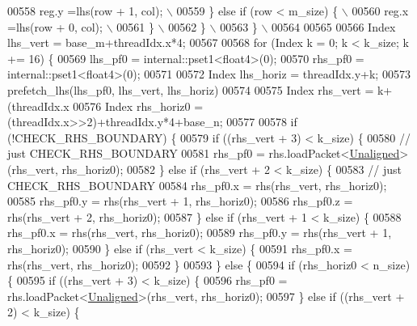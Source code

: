 \begin{DoxyCode}
00558 \textcolor{preprocessor}{          reg.y =lhs(row + 1, col);                   \(\backslash\)}
00559 \textcolor{preprocessor}{        \} else if (row  < m\_size) \{                   \(\backslash\)}
00560 \textcolor{preprocessor}{          reg.x =lhs(row + 0, col);                   \(\backslash\)}
00561 \textcolor{preprocessor}{        \}                                             \(\backslash\)}
00562 \textcolor{preprocessor}{      \}                                               \(\backslash\)}
00563 \textcolor{preprocessor}{    \}                                                 \(\backslash\)}
00564 \textcolor{preprocessor}{}
00565 
00566   Index lhs\_vert = base\_m+threadIdx.x*4;
00567 
00568   \textcolor{keywordflow}{for} (Index k = 0; k < k\_size; k += 16) \{
00569     lhs\_pf0 = internal::pset1<float4>(0);
00570     rhs\_pf0 = internal::pset1<float4>(0);
00571 
00572     Index lhs\_horiz = threadIdx.y+k;
00573     prefetch\_lhs(lhs\_pf0, lhs\_vert, lhs\_horiz)
00574 
00575     Index rhs\_vert = k+(threadIdx.x%
00576     Index rhs\_horiz0 = (threadIdx.x>>2)+threadIdx.y*4+base\_n;
00577 
00578     if (!CHECK\_RHS\_BOUNDARY) \{
00579       \textcolor{keywordflow}{if} ((rhs\_vert + 3) < k\_size) \{
00580         \textcolor{comment}{// just CHECK\_RHS\_BOUNDARY}
00581         rhs\_pf0 = rhs.loadPacket<\hyperlink{group__enums_gga45fe06e29902b7a2773de05ba27b47a1ac935220b4c844108e183ebe30a4d5204}{Unaligned}>(rhs\_vert, rhs\_horiz0);
00582       \} \textcolor{keywordflow}{else} \textcolor{keywordflow}{if} (rhs\_vert + 2 < k\_size) \{
00583         \textcolor{comment}{// just CHECK\_RHS\_BOUNDARY}
00584         rhs\_pf0.x = rhs(rhs\_vert, rhs\_horiz0);
00585         rhs\_pf0.y = rhs(rhs\_vert + 1, rhs\_horiz0);
00586         rhs\_pf0.z = rhs(rhs\_vert + 2, rhs\_horiz0);
00587       \} \textcolor{keywordflow}{else} \textcolor{keywordflow}{if} (rhs\_vert + 1 < k\_size) \{
00588         rhs\_pf0.x = rhs(rhs\_vert, rhs\_horiz0);
00589         rhs\_pf0.y = rhs(rhs\_vert + 1, rhs\_horiz0);
00590       \} \textcolor{keywordflow}{else} \textcolor{keywordflow}{if} (rhs\_vert  < k\_size) \{
00591         rhs\_pf0.x = rhs(rhs\_vert, rhs\_horiz0);
00592       \}
00593     \} \textcolor{keywordflow}{else} \{
00594       \textcolor{keywordflow}{if} (rhs\_horiz0 < n\_size) \{
00595         \textcolor{keywordflow}{if} ((rhs\_vert + 3) < k\_size) \{
00596           rhs\_pf0 = rhs.loadPacket<\hyperlink{group__enums_gga45fe06e29902b7a2773de05ba27b47a1ac935220b4c844108e183ebe30a4d5204}{Unaligned}>(rhs\_vert, rhs\_horiz0);
00597         \} \textcolor{keywordflow}{else} \textcolor{keywordflow}{if} ((rhs\_vert + 2) < k\_size) \{

\end{DoxyCode}
